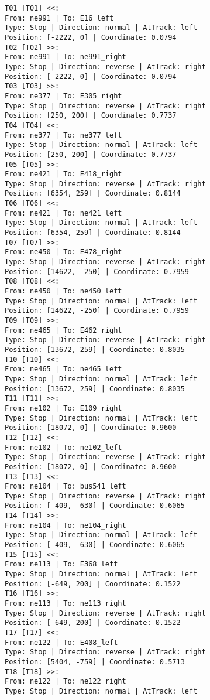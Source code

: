 	\begin{lstlisting}[language = {}, tabsize=4, basicstyle=\footnotesize\ttfamily, showspaces=false, showstringspaces=false, caption = Signalling.RNA, label = {lst:EJ4_6}]
T01 [T01] <<:
From: ne991 | To: E16_left
Type: Stop | Direction: normal | AtTrack: left 
Position: [-2222, 0] | Coordinate: 0.0794
T02 [T02] >>:
From: ne991 | To: ne991_right
Type: Stop | Direction: reverse | AtTrack: right 
Position: [-2222, 0] | Coordinate: 0.0794
T03 [T03] >>:
From: ne377 | To: E305_right
Type: Stop | Direction: reverse | AtTrack: right 
Position: [250, 200] | Coordinate: 0.7737
T04 [T04] <<:
From: ne377 | To: ne377_left
Type: Stop | Direction: normal | AtTrack: left 
Position: [250, 200] | Coordinate: 0.7737
T05 [T05] >>:
From: ne421 | To: E418_right
Type: Stop | Direction: reverse | AtTrack: right 
Position: [6354, 259] | Coordinate: 0.8144
T06 [T06] <<:
From: ne421 | To: ne421_left
Type: Stop | Direction: normal | AtTrack: left 
Position: [6354, 259] | Coordinate: 0.8144
T07 [T07] >>:
From: ne450 | To: E478_right
Type: Stop | Direction: reverse | AtTrack: right 
Position: [14622, -250] | Coordinate: 0.7959
T08 [T08] <<:
From: ne450 | To: ne450_left
Type: Stop | Direction: normal | AtTrack: left 
Position: [14622, -250] | Coordinate: 0.7959
T09 [T09] >>:
From: ne465 | To: E462_right
Type: Stop | Direction: reverse | AtTrack: right 
Position: [13672, 259] | Coordinate: 0.8035
T10 [T10] <<:
From: ne465 | To: ne465_left
Type: Stop | Direction: normal | AtTrack: left 
Position: [13672, 259] | Coordinate: 0.8035
T11 [T11] >>:
From: ne102 | To: E109_right
Type: Stop | Direction: normal | AtTrack: left 
Position: [18072, 0] | Coordinate: 0.9600
T12 [T12] <<:
From: ne102 | To: ne102_left
Type: Stop | Direction: reverse | AtTrack: right 
Position: [18072, 0] | Coordinate: 0.9600
T13 [T13] <<:
From: ne104 | To: bus541_left
Type: Stop | Direction: reverse | AtTrack: right 
Position: [-409, -630] | Coordinate: 0.6065
T14 [T14] >>:
From: ne104 | To: ne104_right
Type: Stop | Direction: normal | AtTrack: left 
Position: [-409, -630] | Coordinate: 0.6065
T15 [T15] <<:
From: ne113 | To: E368_left
Type: Stop | Direction: normal | AtTrack: left 
Position: [-649, 200] | Coordinate: 0.1522
T16 [T16] >>:
From: ne113 | To: ne113_right
Type: Stop | Direction: reverse | AtTrack: right 
Position: [-649, 200] | Coordinate: 0.1522
T17 [T17] <<:
From: ne122 | To: E408_left
Type: Stop | Direction: reverse | AtTrack: right 
Position: [5404, -759] | Coordinate: 0.5713
T18 [T18] >>:
From: ne122 | To: ne122_right
Type: Stop | Direction: normal | AtTrack: left 

\end{lstlisting}
